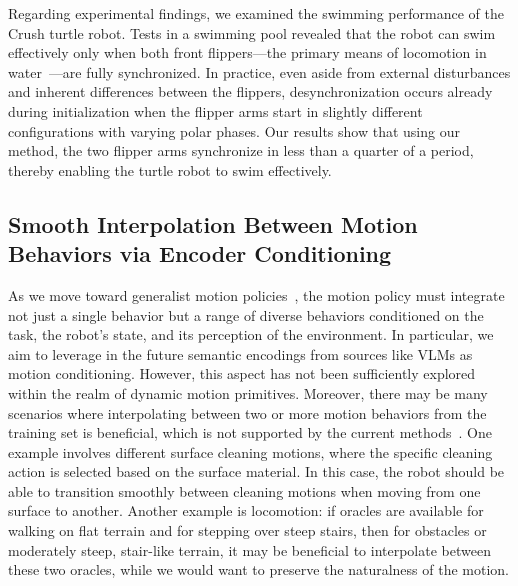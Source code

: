 Regarding experimental findings, we examined the swimming performance of the Crush turtle robot. Tests in a swimming pool revealed that the robot can swim effectively only when both front flippers—the primary means of locomotion in water~\citep{van2022new, van2023soft}—are fully synchronized. In practice, even aside from external disturbances and inherent differences between the flippers, desynchronization occurs already during initialization when the flipper arms start in slightly different configurations with varying polar phases. Our results show that using our method, the two flipper arms synchronize in less than a quarter of a period, thereby enabling the turtle robot to swim effectively.

\subsection{Smooth Interpolation Between Motion Behaviors via Encoder Conditioning}

As we move toward generalist motion policies~\citep{o2024open, black2024pi0, gemini2025robotics}, the motion policy must integrate not just a single behavior but a range of diverse behaviors conditioned on the task, the robot’s state, and its perception of the environment. In particular, we aim to leverage in the future semantic encodings from sources like \glspl{VLM} as motion conditioning. However, this aspect has not been sufficiently explored within the realm of dynamic motion primitives. Moreover, there may be many scenarios where interpolating between two or more motion behaviors from the training set is beneficial, which is not supported by the current methods~\citep{rana2020euclideanizing, perez2023stable, perez2024puma, sochopoulos2024learning, zhi2024teaching}.
%
One example involves different surface cleaning motions, where the specific cleaning action is selected based on the surface material. In this case, the robot should be able to transition smoothly between cleaning motions when moving from one surface to another. Another example is locomotion: if oracles are available for walking on flat terrain and for stepping over steep stairs, then for obstacles or moderately steep, stair-like terrain, it may be beneficial to interpolate between these two oracles, while we would want to preserve the naturalness of the motion.

